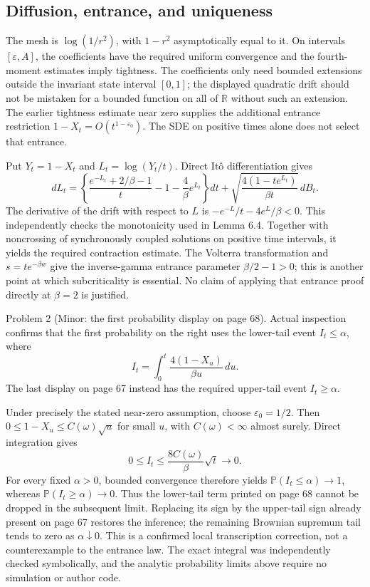 \documentclass[10pt]{article}
\begin{document}
\subsection*{Diffusion, entrance, and uniqueness}
The mesh is \(\log(1/r^2)\), with \(1-r^2\) asymptotically equal to it. On intervals \([\varepsilon,A]\), the coefficients have the required uniform convergence and the fourth-moment estimates imply tightness. The coefficients only need bounded extensions outside the invariant state interval \([0,1]\); the displayed quadratic drift should not be mistaken for a bounded function on all of \(\mathbb R\) without such an extension. The earlier tightness estimate near zero supplies the additional entrance restriction \(1-X_t=O(t^{1-\varepsilon_0})\). The SDE on positive times alone does not select that entrance.\par
Put \(Y_t=1-X_t\) and \(L_t=\log(Y_t/t)\). Direct Itô differentiation gives \[dL_t=\left\{\frac{e^{-L_t}+2/\beta-1}{t}
                      -1-\frac4\beta e^{L_t}\right\}dt
       +\sqrt{\frac{4(1-te^{L_t})}{\beta t}}\,dB_t .\] The derivative of the drift with respect to \(L\) is \(-e^{-L}/t-4e^L/\beta<0\). This independently checks the monotonicity used in Lemma 6.4. Together with noncrossing of synchronously coupled solutions on positive time intervals, it yields the required contraction estimate. The Volterra transformation and \(s=t e^{-\beta w}\) give the inverse-gamma entrance parameter \(\beta/2-1>0\); this is another point at which subcriticality is essential. No claim of applying that entrance proof directly at \(\beta=2\) is justified.\par
Problem 2 (Minor: the first probability display on page 68).  Actual inspection confirms that the first probability on the right uses the lower-tail event \(I_t\leq\alpha\), where \[I_t=\int_0^t\frac{4(1-X_u)}{\beta u}\,du.\] The last display on page 67 instead has the required upper-tail event \(I_t\geq\alpha\).\par
Under precisely the stated near-zero assumption, choose \(\varepsilon_0=1/2\). Then \(0\leq1-X_u\leq C(\omega)\sqrt u\) for small \(u\), with \(C(\omega)<\infty\) almost surely. Direct integration gives \[0\leq I_t\leq\frac{8C(\omega)}{\beta}\sqrt t\longrightarrow0.\] For every fixed \(\alpha>0\), bounded convergence therefore yields \(\mathbb P(I_t\leq\alpha)\to1\), whereas \(\mathbb P(I_t\geq\alpha)\to0\). Thus the lower-tail term printed on page 68 cannot be dropped in the subsequent limit. Replacing its sign by the upper-tail sign already present on page 67 restores the inference; the remaining Brownian supremum tail tends to zero as \(\alpha\downarrow0\). This is a confirmed local transcription correction, not a counterexample to the entrance law. The exact integral was independently checked symbolically, and the analytic probability limits above require no simulation or author code.\par
\end{document}
